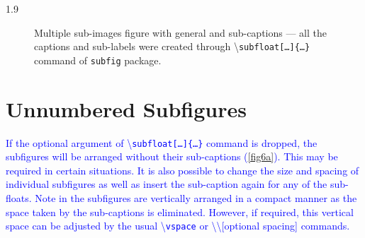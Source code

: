 \documentclass[phd]{ndsu-thesis-2022}
\newcommand\myspacing{1.9} %
\newcommand\italk[1]{\textcolor{blue}{#1}}  %
\newcommand\cmd[1]{\textbackslash\texttt{#1}}  %
\begin{document}
\begin{spacing}{\myspacing}
\begin{figure}[H]
\hspace{1.2in}
\hspace{1.2in}

\captionsetup{singlelinecheck=false} %
\caption{Multiple sub-images figure with general and sub-captions  --- all the captions and sub-labels were created through \cmd{subfloat[\ldots]\{\ldots\}} command of \texttt{subfig} package.} \label{fig6}
\end{figure}
\clearpage

\section{Unnumbered Subfigures}
\italk{If the optional argument of \cmd{subfloat[\ldots]\{\ldots\}} command is dropped, the subfigures will be arranged without their sub-captions (\cref{fig6a}). This may be required in certain situations. It is also possible to change the size and spacing of individual subfigures as well as insert the sub-caption again for any of the sub-floats. Note in \Cref{fig6a} the subfigures are vertically arranged in a compact manner as the space taken by the sub-captions is eliminated. However, if required, this vertical space can be adjusted by the usual \cmd{vspace} or \textbackslash\textbackslash [optional spacing] commands.  
}


\end{spacing}
\end{document}
